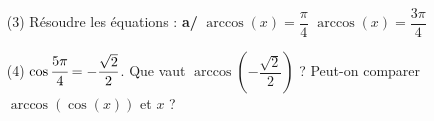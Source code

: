 
\begin{exercice}\label{exostarterST-0010-0011versionpourcorrige}
 
\begin{enumerate}
\item[(3)] Résoudre  les équations : {\bfseries  a/} $\arccos (x) = \dfrac{\pi}{4}$    $\arccos (x) = \dfrac{3\pi}{4}$
\item[(4)] $\cos \cfrac{5\pi}4=-\dfrac{\sqrt2}2$. Que vaut $\arccos(-\dfrac{\sqrt{2}}2)$ ? Peut-on comparer $\arccos(\cos (x))$ et $x$ ?
\end{enumerate}

\end{exercice}

